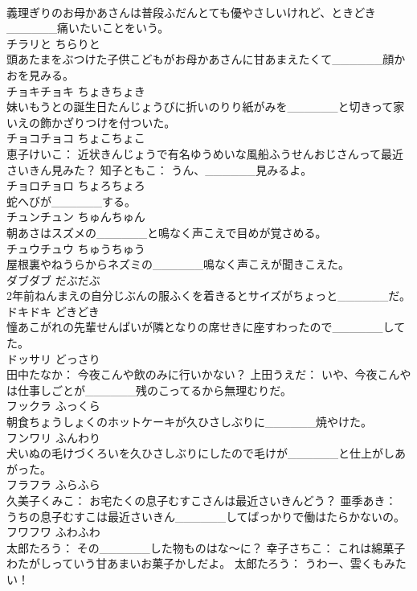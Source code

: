 \documentclass[8pt]{extreport}
\begin{document}
\begin{CJK}{UTF8}{min}
\\	義理ぎりのお母かあさんは普段ふだんとても優やさしいけれど、ときどき______痛いたいことをいう。	
\\	チラリと	ちらりと	
\\	頭あたまをぶつけた子供こどもがお母かあさんに甘あまえたくて______顔かおを見みる。	
\\	チョキチョキ	ちょきちょき	
\\	妹いもうとの誕生日たんじょうびに折いのりり紙がみを______と切きって家いえの飾かざりつけを付ついた。	
\\	チョコチョコ	ちょこちょこ	
\\	恵子けいこ： 近状きんじょうで有名ゆうめいな風船ふうせんおじさんって最近さいきん見みた？ 知子ともこ： うん、______見みるよ。	
\\	チョロチョロ	ちょろちょろ	
\\	蛇へびが______する。	
\\	チュンチュン	ちゅんちゅん	
\\	朝あさはスズメの______と鳴なく声こえで目めが覚さめる。	
\\	チュウチュウ	ちゅうちゅう	
\\	屋根裏やねうらからネズミの______鳴なく声こえが聞きこえた。	
\\	ダブダブ	だぶだぶ	
\\	2年前ねんまえの自分じぶんの服ふくを着きるとサイズがちょっと______だ。	
\\	ドキドキ	どきどき	
\\	憧あこがれの先輩せんぱいが隣となりの席せきに座すわったので______してた。	
\\	ドッサリ	どっさり	
\\	田中たなか： 今夜こんや飲のみに行いかない？ 上田うえだ： いや、今夜こんやは仕事しごとが______残のこってるから無理むりだ。	
\\	フックラ	ふっくら	
\\	朝食ちょうしょくのホットケーキが久ひさしぶりに______焼やけた。	
\\	フンワリ	ふんわり	
\\	犬いぬの毛けづくろいを久ひさしぶりにしたので毛けが______と仕上がしあがった。	
\\	フラフラ	ふらふら	
\\	久美子くみこ： お宅たくの息子むすこさんは最近さいきんどう？ 亜季あき： うちの息子むすこは最近さいきん______してばっかりで働はたらかないの。	
\\	フワフワ	ふわふわ	
\\	太郎たろう： その______した物ものはな～に？ 幸子さちこ： これは綿菓子わたがしっていう甘あまいお菓子かしだよ。 太郎たろう： うわー、雲くもみたい！	

\end{CJK}
\end{document}

